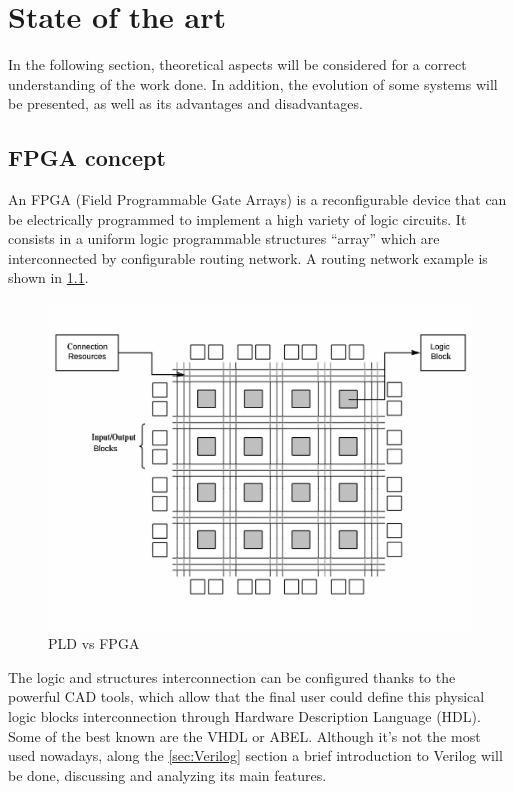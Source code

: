 \chapter{State of the art}\label{sec:Estado_arte}
In the following section, theoretical aspects will be considered for a correct understanding of the work done. In addition, the evolution of some systems will be presented, as well as its advantages and disadvantages.
\section{FPGA concept}
An FPGA\cite{FPGAWhat} (Field Programmable Gate Arrays) is a reconfigurable device that can be electrically programmed to implement a high variety of logic circuits. It consists in a uniform logic programmable structures “array” which are interconnected by configurable routing network. A routing network example is shown in \ref{fig:estructura_FPGA}.

\begin{center}
	\begin{figure}[H]
		\center
		\includegraphics[trim = 0mm 10mm 0mm 10mm, clip,scale=0.4]{imagenes/EstadoArte/estructura_FPGA.pdf}
		\caption{PLD vs FPGA}
		\label{fig:estructura_FPGA}
	\end{figure}
\end{center}

The logic and structures interconnection can be configured thanks to the powerful CAD tools, which allow that the final user could define this physical logic blocks interconnection through Hardware Description Language (HDL). Some of the best known are the VHDL or ABEL. Although it’s not the most used nowadays, along the \ref{sec:Verilog} section a brief introduction to Verilog will be done, discussing and analyzing its main features.
